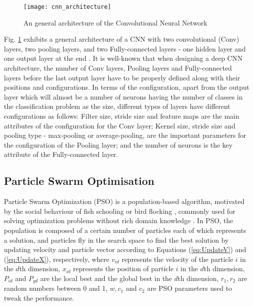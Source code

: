 \documentclass[conference]{IEEEtran}
\begin{document}
\begin{figure}[!t]
	\centering
	\texttt{[image: cnn\_architecture]}
	\caption{An general architecture of the Convolutional Neural Network \cite{CNNFig:Tim}}
	\label{fig:CNNArchitecture}
\end{figure}

Fig. \ref{fig:CNNArchitecture} exhibits a general architecture of a CNN with two convolutional (Conv) layers, two pooling layers, and two Fully-connected layers - one hidden layer and one output layer at the end \cite{CNNFig:Tim}. It is well-known that when designing a deep CNN architecture, the number of Conv layers, Pooling layers and Fully-connected layers before the last output layer have to be properly defined along with their positions and configurations. In terms of the configuration, apart from the output layer which will almost be a number of neurons having the number of classes in the classification problem as the size, different types of layers have different configurations as follows: Filter size, stride size and feature maps are the main attributes of the configuration for the Conv layer; Kernel size, stride size and pooling type - max-pooling or average-pooling, are the important parameters for the configuration of the Pooling layer; and the number of neurons is the key attribute of the Fully-connected layer. %

\subsection{Particle Swarm Optimisation}

Particle Swarm Optimization (PSO) is a population-based algorithm, motivated by the social behaviour of fish schooling or bird flocking \cite{PSOIntro:Kennedy} \cite{PSOIntro:Eberhart}, commonly used for solving optimization problems without rich domain knowledge \cite{PSOIntro:Yanan}. In PSO, the population is composed of a certain number of particles each of which represents a solution, and particles fly in the search space to find the best solution by updating velocity and particle vector according to Equations (\ref{eq:UpdateV}) and (\ref{eq:UpdateX}), respectively, where $v_{id}$ represents the velocity of the particle $i$ in the $d$th dimension, $x_{id}$ represents the position of particle $i$ in the $d$th dimension, $P_{id}$ and $P_{gd}$ are the local best and the global best in the $d$th dimension, $r_{1}, r_{2}$ are random numbers between 0 and 1, $w, c_{1}$ and $c_{2}$ are PSO parameters used to tweak the performance.
\end{document}
